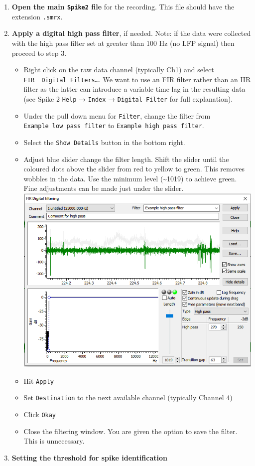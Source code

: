 \documentclass[
]{book}
\providecommand{\tightlist}{%
  \setlength{\itemsep}{0pt}\setlength{\parskip}{0pt}}
\begin{document}
\begin{enumerate}
\def\labelenumi{\arabic{enumi}.}
\tightlist
\item
  \textbf{Open the main \texttt{Spike2} file} for the recording. This file should have the
  extension \texttt{.smrx}.
\item
  \textbf{Apply a digital high pass filter}, if needed. Note: if the
  data were collected with the high pass filter set at greater than 100 Hz (no LFP
  signal) then proceed to step 3.

  \begin{itemize}
  \tightlist
  \item
    Right click on the raw data channel (typically Ch1) and select \texttt{FIR\ \ Digital\ Filters…}. We want to use an FIR filter rather than an IIR filter as
    the latter can introduce a variable time lag in the resulting data (see
    Spike 2 \texttt{Help} → \texttt{Index} → \texttt{Digital\ Filter} for full explanation).
  \item
    Under the pull down menu for \texttt{Filter}, change the filter from
    \texttt{Example\ low\ pass\ filter} to \texttt{Example\ high\ pass\ filter}.
  \item
    Select the \texttt{Show\ Details} button in the bottom right.
  \item
    Adjust blue slider change the filter length. Shift the slider until
    the coloured dots above the slider from red to yellow to green. This removes
    wobbles in the data. Use the minimum level (\textasciitilde1019) to achieve green.
    Fine adjustments can be made just under the slider.
    \includegraphics{source_images/sec3.1.1_FIR_filtering.png}
  \item
    Hit \texttt{Apply}
  \item
    Set \texttt{Destination} to the next available channel (typically Channel 4)
  \item
    Click \texttt{Okay}
  \item
    Close the filtering window. You are given the option to save
    the filter. This is unnecessary.
  \end{itemize}
\item
  \textbf{Setting the threshold for spike identification}


\end{enumerate}
\end{document}
